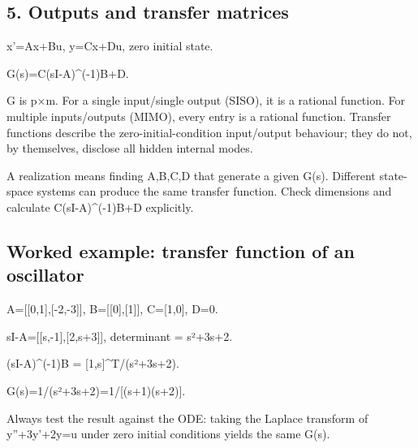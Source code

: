 \documentclass[11pt,a4paper]{article}
\begin{document}
\subsection{5. Outputs and transfer matrices}
\begin{equationbox}\raggedright
{\ttfamily\small x'=Ax+Bu, y=Cx+Du, zero initial state.}\par
\end{equationbox}
\begin{equationbox}\raggedright
{\ttfamily\small G(s)=C(sI-A)\textasciicircum{}(-1)B+D.}\par
\end{equationbox}
\begin{conceptbox}G is p×m. For a single input/single output (SISO), it is a rational function. For multiple inputs/outputs (MIMO), every entry is a rational function. Transfer functions describe the zero-initial-condition input/output behaviour; they do not, by themselves, disclose all hidden internal modes.\end{conceptbox}
\begin{conceptbox}A realization means finding A,B,C,D that generate a given G(s). Different state-space systems can produce the same transfer function. Check dimensions and calculate C(sI-A)\textasciicircum{}(-1)B+D explicitly.\end{conceptbox}

\subsection{Worked example: transfer function of an oscillator}
\begin{equationbox}\raggedright
{\ttfamily\small A=[[0,1],[-2,-3]], B=[[0],[1]], C=[1,0], D=0.}\par
\end{equationbox}
\begin{equationbox}\raggedright
{\ttfamily\small sI-A=[[s,-1],[2,s+3]], determinant = s²+3s+2.}\par
\end{equationbox}
\begin{equationbox}\raggedright
{\ttfamily\small (sI-A)\textasciicircum{}(-1)B = [1,s]\textasciicircum{}T/(s²+3s+2).}\par
\end{equationbox}
\begin{equationbox}\raggedright
{\ttfamily\small G(s)=1/(s²+3s+2)=1/[(s+1)(s+2)].}\par
\end{equationbox}
\begin{conceptbox}Always test the result against the ODE: taking the Laplace transform of y''+3y'+2y=u under zero initial conditions yields the same G(s).\end{conceptbox}
\end{document}
